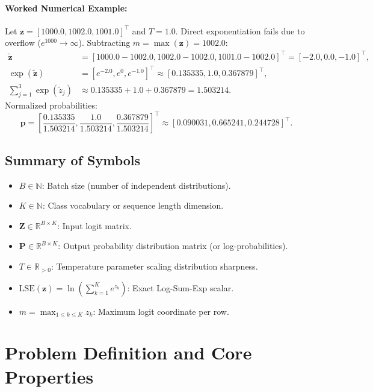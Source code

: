 \documentclass[11pt]{article}
\begin{document}
\paragraph{Worked Numerical Example:}
Let $\mathbf{z} = [1000.0, 1002.0, 1001.0]^\top$ and $T = 1.0$.
Direct exponentiation fails due to overflow ($e^{1000} \to \infty$).
Subtracting $m = \max(\mathbf{z}) = 1002.0$:
\begin{align}
\tilde{\mathbf{z}} &= [1000.0 - 1002.0, 1002.0 - 1002.0, 1001.0 - 1002.0]^\top = [-2.0, 0.0, -1.0]^\top, \\
\exp(\tilde{\mathbf{z}}) &= [e^{-2.0}, e^0, e^{-1.0}]^\top \approx [0.135335, 1.0, 0.367879]^\top, \\
\sum_{j=1}^3 \exp(\tilde{z}_j) &\approx 0.135335 + 1.0 + 0.367879 = 1.503214.
\end{align}
Normalized probabilities:
\begin{equation}
\mathbf{p} = \left[ \frac{0.135335}{1.503214}, \frac{1.0}{1.503214}, \frac{0.367879}{1.503214} \right]^\top \approx [0.090031, 0.665241, 0.244728]^\top.
\end{equation}

\subsection{Summary of Symbols}
\begin{itemize}
    \item $B \in \mathbb{N}$: Batch size (number of independent distributions).
    \item $K \in \mathbb{N}$: Class vocabulary or sequence length dimension.
    \item $\mathbf{Z} \in \mathbb{R}^{B \times K}$: Input logit matrix.
    \item $\mathbf{P} \in \mathbb{R}^{B \times K}$: Output probability distribution matrix (or log-probabilities).
    \item $T \in \mathbb{R}_{>0}$: Temperature parameter scaling distribution sharpness.
    \item $\text{LSE}(\mathbf{z}) = \ln \left( \sum_{k=1}^K e^{z_k} \right)$: Exact Log-Sum-Exp scalar.
    \item $m = \max_{1 \le k \le K} z_k$: Maximum logit coordinate per row.
\end{itemize}

\section{Problem Definition and Core Properties}
\label{sec:problem_definition}
\end{document}
